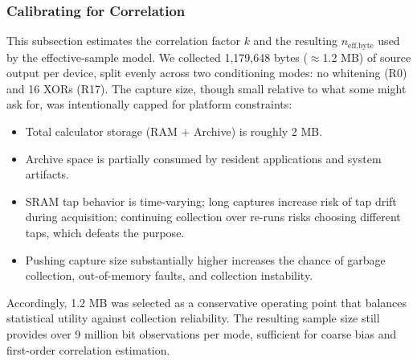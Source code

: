 \documentclass[titlepage]{report}
\begin{document}
{			\newcommand{\CalibXAxisMax}{5.6}
			\newcommand{\CalibXAxisLabel}{5.65}
			\newcommand{\CalibXTicks}{\draw (1,0.55) -- (1,0.65);\node[below] at (1,0.55) {\scriptsize 1}; \draw (2,0.55) -- (2,0.65);\node[below] at (2,0.55) {\scriptsize 2}; \draw (3,0.55) -- (3,0.65);\node[below] at (3,0.55) {\scriptsize 3}; \draw (4,0.55) -- (4,0.65);\node[below] at (4,0.55) {\scriptsize 4}; \draw (5,0.55) -- (5,0.65);\node[below] at (5,0.55) {\scriptsize 5};}
			\newcommand{\CalibXorReads}{17}
			\newcommand{\CalibPoolBytes}{119}
			\newcommand{\CalibOutputBits}{64}
			\newcommand{\CalibPWorst}{0.7500}
			\newcommand{\CalibNeffByte}{14}
			\newcommand{\CalibNeffPool}{1702}
			\newcommand{\CalibPOutByte}{0.49997}
			\newcommand{\CalibPOutPool}{0.50000}
			\newcommand{\CalibMinEntropyBit}{0.99991}
			\newcommand{\CalibMinEntropyOutput}{1.00000}
			\newcommand{\CalibDisplayCount}{5}
			\newcommand{\CalibTotalCount}{5}
			\newcommand{\CalibTruncatedNote}{}
		}
		
	
	
	\subsubsection{Calibrating for Correlation}
	\label{ssec:correlation_calibration}
	This subsection estimates the correlation factor $k$ and the resulting $n_{\text{eff,byte}}$ used by the effective-sample model. We collected 1,179,648 bytes ($\approx$1.2 MB) of source output per device, split evenly across two conditioning modes: no whitening (R0) and 16 XORs (R17). The capture size, though small relative to what some might ask for, was intentionally capped for platform constraints:
	\begin{itemize}
		\item Total calculator storage (RAM + Archive) is roughly 2 MB.
		\item Archive space is partially consumed by resident applications and system artifacts.
		\item SRAM tap behavior is time-varying; long captures increase risk of tap drift during acquisition; continuing collection over re-runs risks choosing different taps, which defeats the purpose.
		\item Pushing capture size substantially higher increases the chance of garbage collection, out-of-memory faults, and collection instability.
	\end{itemize}
	Accordingly, 1.2 MB was selected as a conservative operating point that balances statistical utility against collection reliability. The resulting sample size still provides over 9 million bit observations per mode, sufficient for coarse bias and first-order correlation estimation.
	
\end{document}
